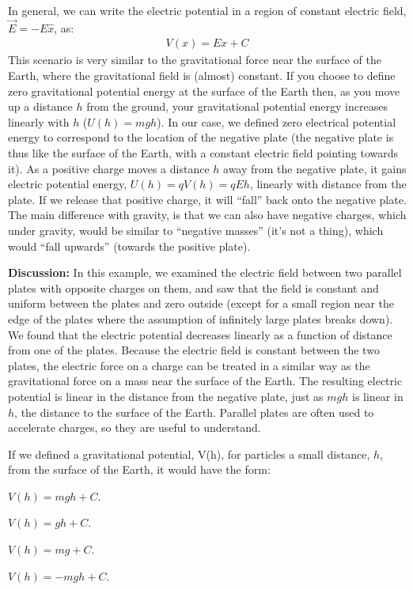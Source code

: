 \begin{example}
In general, we can write the electric potential in a region of constant electric field, $\vec E=-E\hat x$, as:
\begin{align*}
V(x)=Ex + C
\end{align*} 
This scenario is very similar to the gravitational force near the surface of the Earth, where the gravitational field is (almost) constant. If you choose to define zero gravitational potential energy at the surface of the Earth then, as you move up a distance $h$ from the ground, your gravitational potential energy increases linearly with $h$ ($U(h)=mgh$). In our case, we defined zero electrical potential energy to correspond to the location of the negative plate (the negative plate is thus like the surface of the Earth, with a constant electric field pointing towards it). As a positive charge moves a distance $h$ away from the negative plate, it gains electric potential energy, $U(h)=qV(h)=qEh$, linearly with distance from the plate. If we release that positive charge, it will ``fall'' back onto the negative plate. The main difference with gravity, is that we can also have negative charges, which under gravity, would be similar to ``negative masses'' (it's not a thing), which would ``fall upwards'' (towards the positive plate).  

\textbf{Discussion:} In this example, we examined the electric field between two parallel plates with opposite charges on them, and saw that the field is constant and uniform between the plates and zero outside (except for a small region near the edge of the plates where the assumption of infinitely large plates breaks down). We found that the electric potential decreases linearly as a function of distance from one of the plates. Because the electric field is constant between the two plates, the electric force on a charge can be treated in a similar way as the gravitational force on a mass near the surface of the Earth. The resulting electric potential is linear in the distance from the negative plate, just as $mgh$ is linear in $h$, the distance to the surface of the Earth. Parallel plates are often used to accelerate charges, so they are useful to understand. 
\end{example}

%
\begin{checkpoint}
	\begin{MCquestion}{If we defined a gravitational potential, V(h), for particles a small distance, $h$, from the surface of the Earth, it would have the form:}
		\item $V(h) = mgh + C$.
		\item $V(h) = gh + C$. \correct
		\item $V(h) = mg + C$.
		\item $V(h) = -mgh + C$.
	\end{MCquestion}
\end{checkpoint}


